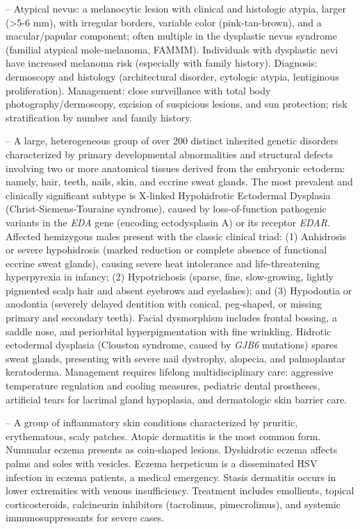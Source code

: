 -- Atypical nevus: a melanocytic lesion with clinical and histologic atypia, larger (>5-6 mm), with irregular borders, variable color (pink-tan-brown), and a macular/papular component; often multiple in the dysplastic nevus syndrome (familial atypical mole-melanoma, FAMMM). Individuals with dysplastic nevi have increased melanoma risk (especially with family history). Diagnosis: dermoscopy and histology (architectural disorder, cytologic atypia, lentiginous proliferation). Management: close surveillance with total body photography/dermoscopy, excision of suspicious lesions, and sun protection; risk stratification by number and family history.

-- A large, heterogeneous group of over 200 distinct inherited genetic disorders characterized by primary developmental abnormalities and structural defects involving two or more anatomical tissues derived from the embryonic ectoderm: namely, hair, teeth, nails, skin, and eccrine sweat glands. The most prevalent and clinically significant subtype is X-linked Hypohidrotic Ectodermal Dysplasia (Christ-Siemens-Touraine syndrome), caused by loss-of-function pathogenic variants in the \textit{EDA} gene (encoding ectodysplasin A) or its receptor \textit{EDAR}. Affected hemizygous males present with the classic clinical triad: (1) Anhidrosis or severe hypohidrosis (marked reduction or complete absence of functional eccrine sweat glands), causing severe heat intolerance and life-threatening hyperpyrexia in infancy; (2) Hypotrichosis (sparse, fine, slow-growing, lightly pigmented scalp hair and absent eyebrows and eyelashes); and (3) Hypodontia or anodontia (severely delayed dentition with conical, peg-shaped, or missing primary and secondary teeth). Facial dysmorphism includes frontal bossing, a saddle nose, and periorbital hyperpigmentation with fine wrinkling. Hidrotic ectodermal dysplasia (Clouston syndrome, caused by \textit{GJB6} mutations) spares sweat glands, presenting with severe nail dystrophy, alopecia, and palmoplantar keratoderma. Management requires lifelong multidisciplinary care: aggressive temperature regulation and cooling measures, pediatric dental prostheses, artificial tears for lacrimal gland hypoplasia, and dermatologic skin barrier care.

-- A group of inflammatory skin conditions characterized by pruritic, erythematous, scaly patches. Atopic dermatitis is the most common form. Nummular eczema presents as coin-shaped lesions. Dyshidrotic eczema affects palms and soles with vesicles. Eczema herpeticum is a disseminated HSV infection in eczema patients, a medical emergency. Stasis dermatitis occurs in lower extremities with venous insufficiency. Treatment includes emollients, topical corticosteroids, calcineurin inhibitors (tacrolimus, pimecrolimus), and systemic immunosuppressants for severe cases.

